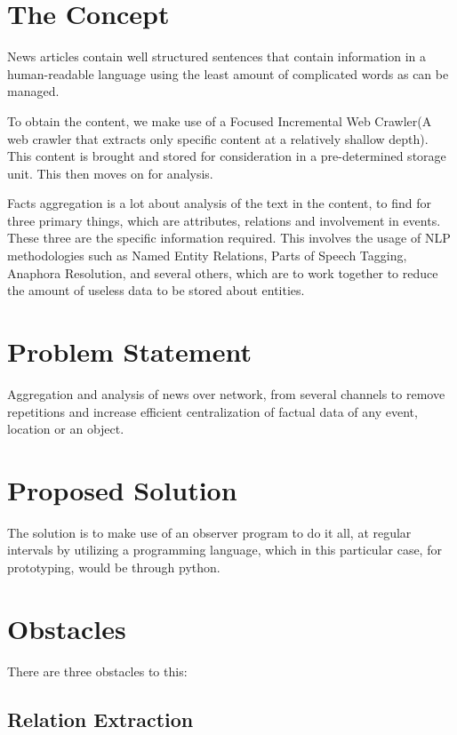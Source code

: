 \documentclass{srmreport}
\begin{document}
\section{The Concept}
News articles contain well structured sentences that contain information in a human-readable language using the least amount of complicated words as can be managed. 
\par To obtain the content, we make use of a Focused Incremental Web Crawler(A web crawler that extracts only specific content at a relatively shallow depth). This content is brought and stored for consideration in a pre-determined storage unit. This then moves on for analysis.
\par Facts aggregation is a lot about analysis of the text in the content, to find for three primary things, which are attributes, relations and involvement in events. These three are the specific information required. This involves the usage of NLP methodologies such as Named Entity Relations, Parts of Speech Tagging, Anaphora Resolution, and several others, which are to work together to reduce the amount of useless data to be stored about entities.


\section{Problem Statement}
Aggregation and analysis of news over network, from several channels to remove repetitions and increase efficient centralization of factual data of any event, location or an object.

\section{Proposed Solution}
The solution is to make use of an observer program to do it all, at regular intervals by utilizing a programming language, which in this particular case, for prototyping, would be through python.

\section{Obstacles}
There are three obstacles to this:
\subsection{Relation Extraction}
\end{document}
